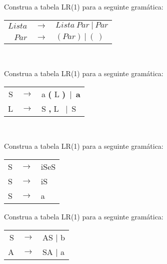 \documentclass{compiladores}
\begin{document}
\begin{listanumerada}
\item \label{g3} Construa a tabela LR(1) para a seguinte gramática:

  \begin{tabular}{rcl}
    $Lista$ & $\rightarrow$ & $Lista\ Par\ |\ Par$ \\ 
    $Par$ & $\rightarrow$ & $( Par )\ |\ (\ )$ \\
  \end{tabular} \\

\item Construa a tabela LR(1) para a seguinte gramática:

     \begin{tabular}{rcl}
     S & $\rightarrow$ & a \textbf( L \textbf)\ $\vert$\ \textbf{a} \\
     L & $\rightarrow$ & S \textbf, L \ $\vert$\ S \\
     \end{tabular} \\

\item Construa a tabela LR(1) para a seguinte gramática: 

  \begin{tabular}{rcl}
    S & $\rightarrow$ & iSeS \\
    S & $\rightarrow$ & iS \\
    S & $\rightarrow$ & a
  \end{tabular}

\item Construa a tabela LR(1) para a seguinte gramática:

     \begin{tabular}{rcl}
     S & $\rightarrow$ & AS $\vert$ b \\
     A & $\rightarrow$ & SA $\vert$ a
     \end{tabular}
\end{listanumerada}
\end{document}

